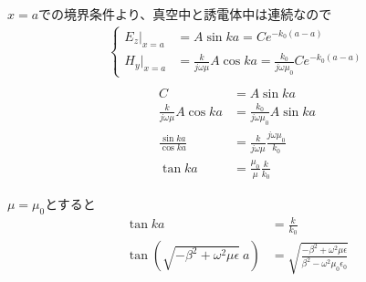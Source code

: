 \documentclass[a4paper,10pt]{bxjsarticle}
\begin{document}
$x=a$での境界条件より、真空中と誘電体中は連続なので
\begin{align*}
    \begin{cases}
        E_z |_{x=a} &= A \sin ka = C e^{-k_0(a-a)} \\
        H_y |_{x=a} &= \frac{k}{j\omega \mu} A \cos ka = \frac{k_0}{j\omega \mu_0} C e^{-k_0(a-a)}
    \end{cases} \\
\end{align*}
\begin{align*}
    C &= A \sin ka \\
    \frac{k}{j\omega \mu} A \cos ka &= \frac{k_0}{j\omega \mu_0} A \sin ka \\
    \frac{\sin ka}{\cos ka} &= \frac{k}{j\omega \mu} \frac{j\omega \mu_0}{k_0}\\
    \tan ka &= \frac{\mu_0}{\mu} \frac{k}{k_0}
\end{align*}

$\mu = \mu_0$とすると
\begin{align*}
    \tan ka &= \frac{k}{k_0}\\
    \tan (\sqrt{-\beta^2+\omega^2 \mu \epsilon}\ a) &= \sqrt{\frac{-\beta^2+\omega^2 \mu \epsilon}{\beta^2-\omega^2 \mu_0 \epsilon_0}}
\end{align*}



  
\end{document}
